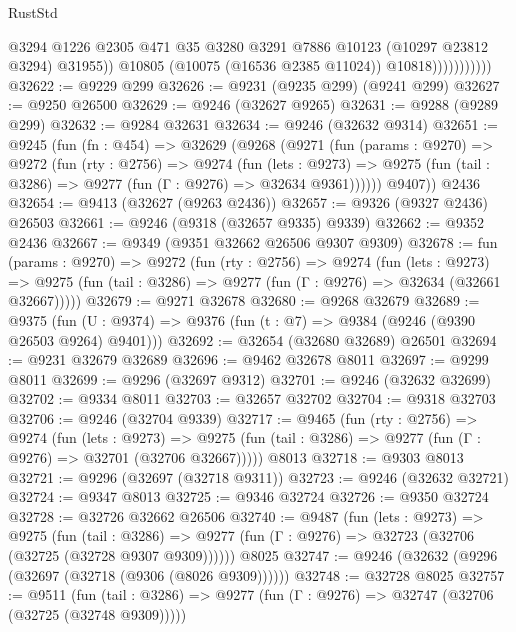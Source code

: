 \begin{lexlean}{RustStd}
\begin{coremodule}
                              @3294
                              @1226
                              @2305
                              @471
                              @35
                              @3280
                              @3291
                              @7886
                              @10123
                              (@10297 @23812 @3294)
                              @31955))
                          @10805
                          (@10075 (@16536 @2385 @11024))
                          @10818)))))))))))
@32622 := @9229 @299
@32626 := @9231 (@9235 @299) (@9241 @299)
@32627 := @9250 @26500
@32629 := @9246 (@32627 @9265)
@32631 := @9288 (@9289 @299)
@32632 := @9284 @32631
@32634 := @9246 (@32632 @9314)
@32651 := @9245
    (fun (fn : @454) =>
    @32629
      (@9268
        (@9271
          (fun (params : @9270) =>
          @9272
            (fun (rty : @2756) =>
            @9274
              (fun (lets : @9273) =>
              @9275 (fun (tail : @3286) => @9277 (fun (Γ : @9276) => @32634 @9361))))))
        @9407))
    @2436
@32654 := @9413 (@32627 (@9263 @2436))
@32657 := @9326 (@9327 @2436) @26503
@32661 := @9246 (@9318 (@32657 @9335) @9339)
@32662 := @9352 @2436
@32667 := @9349 (@9351 @32662 @26506 @9307 @9309)
@32678 := fun (params : @9270) =>
  @9272
    (fun (rty : @2756) =>
    @9274
      (fun (lets : @9273) =>
      @9275 (fun (tail : @3286) => @9277 (fun (Γ : @9276) => @32634 (@32661 @32667)))))
@32679 := @9271 @32678
@32680 := @9268 @32679
@32689 := @9375
    (fun (U : @9374) => @9376 (fun (t : @7) => @9384 (@9246 (@9390 @26503 @9264) @9401)))
@32692 := @32654 (@32680 @32689) @26501
@32694 := @9231 @32679 @32689
@32696 := @9462 @32678 @8011
@32697 := @9299 @8011
@32699 := @9296 (@32697 @9312)
@32701 := @9246 (@32632 @32699)
@32702 := @9334 @8011
@32703 := @32657 @32702
@32704 := @9318 @32703
@32706 := @9246 (@32704 @9339)
@32717 := @9465
    (fun (rty : @2756) =>
    @9274
      (fun (lets : @9273) =>
      @9275 (fun (tail : @3286) => @9277 (fun (Γ : @9276) => @32701 (@32706 @32667)))))
    @8013
@32718 := @9303 @8013
@32721 := @9296 (@32697 (@32718 @9311))
@32723 := @9246 (@32632 @32721)
@32724 := @9347 @8013
@32725 := @9346 @32724
@32726 := @9350 @32724
@32728 := @32726 @32662 @26506
@32740 := @9487
    (fun (lets : @9273) =>
    @9275
      (fun (tail : @3286) =>
      @9277 (fun (Γ : @9276) => @32723 (@32706 (@32725 (@32728 @9307 @9309))))))
    @8025
@32747 := @9246 (@32632 (@9296 (@32697 (@32718 (@9306 (@8026 @9309))))))
@32748 := @32728 @8025
@32757 := @9511
    (fun (tail : @3286) => @9277 (fun (Γ : @9276) => @32747 (@32706 (@32725 (@32748 @9309)))))

\end{coremodule}
\end{lexlean}
